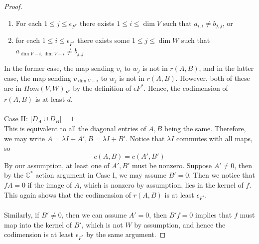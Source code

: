 \documentclass[10pt,a4paper]{amsart}
\begin{document}
\begin{proof}
\begin{enumerate}
    \item[(i)] For each $1\leq j\leq \epsilon_{F^*}$ there exists $1\leq i\leq \dim V$ such that $a_{i,i}\neq b_{j,j}$, or
    \item[(ii)] for each $1\leq i\leq \epsilon_{F^*}$ there exists some $1\leq j\leq \dim W$ such that $a_{\dim V-i,\dim V-i}\neq b_{j,j}$
\end{enumerate} 
In the former case, the map sending $v_i$ to $w_j$ is not in $r(A,B)$, and in the latter case, the map sending $v_{\dim V-i}$ to $w_j$ is not in $r(A,B)$. However, both of these are in $Hom(V,W)_{F^*}$ by the definition of $\epsilon{F^*}$. Hence, the codimension of $r(A,B)$ is at least $d$.
\\~\\ \underline{Case II}: $|D_A\cup D_B|=1$
\\ This is equivalent to all the diagonal entries of $A,B$ being the same. Therefore, we may write $A=\lambda I+A',B=\lambda I+B'$. Notice that $\lambda I$ commutes with all maps, so $$c(A,B)=c(A',B')$$ By our assumption, at least one of $A',B'$ must be nonzero. Suppose $A'\neq 0$, then by the $\mathbb C^*$ action argument in Case I, we may assume $B'=0$. Then we notice that $fA=0$ if the image of $A$, which is nonzero by assumption, lies in the kernel of $f$. This again shows that the codimension of $r(A,B)$ is at least $\epsilon_{F^*}$. 
\\~\\ Similarly, if $B'\neq 0$, then we can assume $A'=0$, then $B'f=0$ implies that $f$ must map into the kernel of $B'$, which is not $W$ by assumption, and hence the codimension is at least $\epsilon_{F^*}$ by the same argument.
\end{proof}
\end{document}
